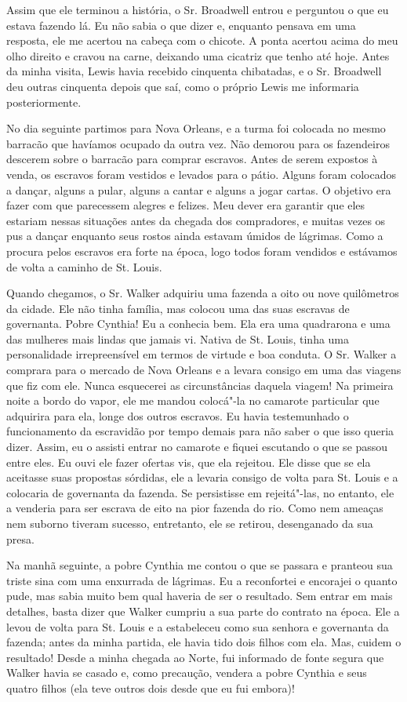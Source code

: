 Assim que ele terminou a história, o Sr. Broadwell entrou e perguntou o
que eu estava fazendo lá. Eu não sabia o que dizer e, enquanto pensava
em uma resposta, ele me acertou na cabeça com o chicote. A ponta acertou
acima do meu olho direito e cravou na carne, deixando uma cicatriz que
tenho até hoje. Antes da minha visita, Lewis havia recebido cinquenta
chibatadas, e o Sr. Broadwell deu outras cinquenta depois que saí, como
o próprio Lewis me informaria posteriormente.

No dia seguinte partimos para Nova Orleans, e a turma foi colocada no
mesmo barracão que havíamos ocupado da outra vez. Não demorou para os
fazendeiros descerem sobre o barracão para comprar escravos. Antes de
serem expostos à venda, os escravos foram vestidos e levados para o
pátio. Alguns foram colocados a dançar, alguns a pular, alguns a cantar \label{ref8}
e alguns a jogar cartas. O objetivo era fazer com que parecessem alegres 
e felizes. Meu dever era garantir que eles estariam nessas situações
antes da chegada dos compradores, e muitas vezes os pus a dançar
enquanto seus rostos ainda estavam úmidos de lágrimas. Como a procura
pelos escravos era forte na época, logo todos foram vendidos e estávamos
de volta a caminho de St. Louis.

Quando chegamos, o Sr. Walker adquiriu uma fazenda a oito ou nove
quilômetros da cidade. Ele não tinha família, mas colocou uma das suas
escravas de governanta. Pobre Cynthia! Eu a conhecia bem. Ela era uma
quadrarona e uma das mulheres mais lindas que jamais vi. Nativa de St.
Louis, tinha uma personalidade irrepreensível em termos de virtude e boa
conduta. O Sr. Walker a comprara para o mercado de Nova Orleans e a
levara consigo em uma das viagens que fiz com ele. Nunca esquecerei as
circunstâncias daquela viagem! Na primeira noite a bordo do vapor, ele
me mandou colocá"-la no camarote particular que adquirira para ela, longe
dos outros escravos. Eu havia testemunhado o funcionamento da escravidão
por tempo demais para não saber o que isso queria dizer. Assim, eu o
assisti entrar no camarote e fiquei escutando o que se passou entre
eles. Eu ouvi ele fazer ofertas vis, que ela rejeitou. Ele disse que se
ela aceitasse suas propostas sórdidas, ele a levaria consigo de volta
para St. Louis e a colocaria de governanta da fazenda. Se persistisse em
rejeitá"-las, no entanto, ele a venderia para ser escrava de eito na pior
fazenda do rio. Como nem ameaças nem suborno tiveram sucesso,
entretanto, ele se retirou, desenganado da sua presa.

Na manhã seguinte, a pobre Cynthia me contou o que se passara e pranteou
sua triste sina com uma enxurrada de lágrimas. Eu a reconfortei e
encorajei o quanto pude, mas sabia muito bem qual haveria de ser o
resultado. Sem entrar em mais detalhes, basta dizer que Walker cumpriu a
sua parte do contrato na época. Ele a levou de volta para St. Louis e a
estabeleceu como sua senhora e governanta da fazenda; antes da minha
partida, ele havia tido dois filhos com ela. Mas, cuidem o resultado!
Desde a minha chegada ao Norte, fui informado de fonte segura que Walker
havia se casado e, como precaução, vendera a pobre Cynthia e seus quatro
filhos (ela teve outros dois desde que eu fui embora)!

